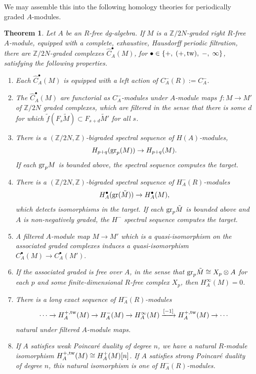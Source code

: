 \documentclass{memo-l}
\newtheorem{theorem}{Theorem}[chapter]
\theoremstyle{definition}
\theoremstyle{remark}
\numberwithin{section}{chapter}
\numberwithin{equation}{chapter}
\begin{document}
We may assemble this into the following homology theories for periodically graded $A$-modules.

\begin{theorem}\label{4flavors-periodic}Let $A$ be an $R$-free dg-algebra. If $M$ is a $\mathbb Z/2N$-graded right $R$-free $A$-module, equipped with a complete, exhaustive, Hausdorff periodic filtration, there are $\mathbb Z/2N$-graded complexes $\hat C^\bullet_A(M)$, for $\bullet \in \{+, \;(+, \textup{tw}), \; -,\; \infty\}$, satisfying the following properties.
\begin{enumerate}
\item Each $\hat C^\bullet_A(M)$ is equipped with a left action of $C^-_A(R) := C^-_A$.
\item The $\hat C^\bullet_A(M)$ are functorial as $C^-_A$-modules under $A$-module maps $f: M \to M'$ of $\mathbb Z/2N$ graded complexes, which are filtered in the sense that there is some $d$ for which $\tilde f(F_s \tilde M) \subset F_{s+d} \tilde M'$ for all $s$.
\item There is a $(\mathbb Z/2N,\mathbb Z)$-bigraded spectral sequence of $H(A)$-modules, $$H_{p+q}(\textup{gr}_p(M)) \rightarrow H_{p+q}(M).$$ If each $\textup{gr}_p M$ is bounded above, the spectral sequence computes the target.
\item There is a $(\mathbb Z/2N,\mathbb Z)$-bigraded spectral sequence of $H^-_A(R)$-modules $$H^\bullet_A(\textup{gr}(\tilde M)) \rightarrow H^\bullet_A(M),$$ which detects isomorphisms in the target. If each $\textup{gr}_p \tilde M$ is bounded above and $A$ is non-negatively graded, the $H^-$ spectral sequence computes the target.
\item A filtered $A$-module map $M \to M'$ which is a quasi-isomorphism on the associated graded complexes induces a quasi-isomorphism $C^\bullet_A(M) \to C^\bullet_A(M').$
\item If the associated graded is free over $A$, in the sense that $\textup{gr}_p \tilde M \cong X_p \otimes A$ for each $p$ and some finite-dimensional $R$-free complex $X_p$, then $H^\infty_A(M) = 0$.
\item There is a long exact sequence of $H^-_A(R)$-modules $$\cdots \to H^{+,\textup{tw}}_A(M) \to H_A^-(M) \to H_A^\infty(M) \xrightarrow{[-1]} H^{+,\textup{tw}}_A(M) \to \cdots$$ natural under filtered $A$-module maps.
\item If $A$ satisfies weak Poincar\'e duality of degree $n$, we have a natural $R$-module isomorphism $H^{+,\textup{tw}}_A(M) \cong H^+_A(M)[n]$. If $A$ satisfies strong Poincar\'e duality of degree $n$, this natural isomorphism is one of $H^-_A(R)$-modules.
\end{enumerate}
\end{theorem}
\end{document}
